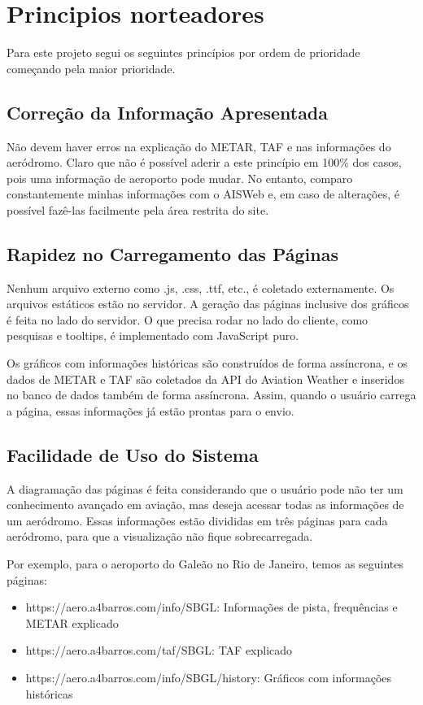 \chapter{Principios norteadores}

Para este projeto segui os seguintes princípios por ordem de prioridade começando pela maior
prioridade.

\section{Correção da Informação Apresentada}
Não devem haver erros na explicação do METAR, TAF e nas informações do aeródromo. Claro que não
é possível aderir a este princípio em 100\% dos casos, pois uma informação de aeroporto pode mudar.
No entanto, comparo constantemente minhas informações com o AISWeb e, em caso de alterações,
é possível fazê-las facilmente pela área restrita do site.

\section{Rapidez no Carregamento das Páginas} Nenhum arquivo externo como .js, .css, .ttf, etc., 
é coletado externamente. Os arquivos estáticos estão no servidor. A geração das páginas inclusive dos
gráficos é feita
no lado do servidor.
O que precisa rodar no lado do cliente, como pesquisas e tooltips, é
implementado com JavaScript puro.

Os gráficos com informações históricas são construídos de forma assíncrona, e os dados de METAR
e TAF são coletados da API do Aviation Weather e inseridos no banco de dados também de forma
assíncrona. Assim, quando o usuário carrega a página, essas informações já estão prontas para o envio.

\section{Facilidade de Uso do Sistema} A diagramação das páginas é feita considerando que o usuário
pode não ter um conhecimento avançado em aviação, mas deseja acessar todas as informações de um
aeródromo. Essas informações estão divididas em três páginas para cada aeródromo, para que a
visualização não fique sobrecarregada.

Por exemplo, para o aeroporto do Galeão no Rio de Janeiro, temos as seguintes páginas:

\begin{itemize}
    \item https://aero.a4barros.com/info/SBGL: Informações de pista, frequências e METAR explicado
    \item https://aero.a4barros.com/taf/SBGL: TAF explicado
    \item https://aero.a4barros.com/info/SBGL/history: Gráficos com informações históricas
\end{itemize}